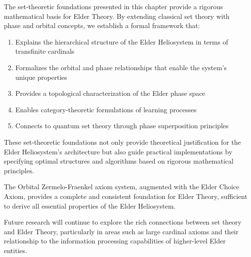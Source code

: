 The set-theoretic foundations presented in this chapter provide a rigorous mathematical basis for Elder Theory. By extending classical set theory with phase and orbital concepts, we establish a formal framework that:

\begin{enumerate}
    \item Explains the hierarchical structure of the Elder Heliosystem in terms of transfinite cardinals
    \item Formalizes the orbital and phase relationships that enable the system's unique properties
    \item Provides a topological characterization of the Elder phase space
    \item Enables category-theoretic formulations of learning processes
    \item Connects to quantum set theory through phase superposition principles
\end{enumerate}

These set-theoretic foundations not only provide theoretical justification for the Elder Heliosystem's architecture but also guide practical implementations by specifying optimal structures and algorithms based on rigorous mathematical principles.

\begin{theorem}
The Orbital Zermelo-Fraenkel axiom system, augmented with the Elder Choice Axiom, provides a complete and consistent foundation for Elder Theory, sufficient to derive all essential properties of the Elder Heliosystem.
\end{theorem}

Future research will continue to explore the rich connections between set theory and Elder Theory, particularly in areas such as large cardinal axioms and their relationship to the information processing capabilities of higher-level Elder entities.